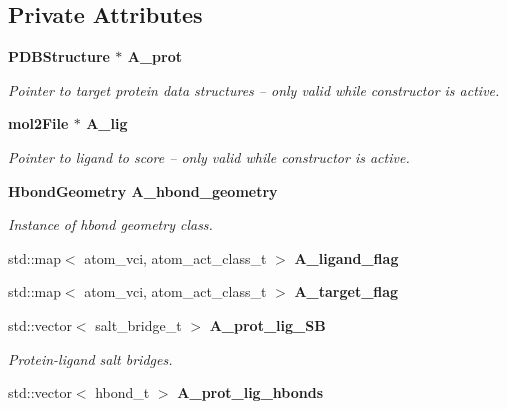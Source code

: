 \subsection*{Private Attributes}
\begin{CompactItemize}
\item 
\bf{PDBStructure} $\ast$ \bf{A\_\-prot}\label{classASCbase_1_1ProtLigScore_5b1a480b3bf5f9c011497ba534fa9461}

\begin{CompactList}\small\item\em Pointer to target protein data structures -- only valid while constructor is active. \item\end{CompactList}\item 
\bf{mol2File} $\ast$ \bf{A\_\-lig}\label{classASCbase_1_1ProtLigScore_dfbf1284c9cbed4b54206df9fdddef28}

\begin{CompactList}\small\item\em Pointer to ligand to score -- only valid while constructor is active. \item\end{CompactList}\item 
\bf{Hbond\-Geometry} \bf{A\_\-hbond\_\-geometry}\label{classASCbase_1_1ProtLigScore_6671697549e83639b589b71488f550d9}

\begin{CompactList}\small\item\em Instance of hbond geometry class. \item\end{CompactList}\item 
std::map$<$ atom\_\-vci, atom\_\-act\_\-class\_\-t $>$ \textbf{A\_\-ligand\_\-flag}\label{classASCbase_1_1ProtLigScore_8b4747bab4ae82a169058b0aef3a2f42}

\item 
std::map$<$ atom\_\-vci, atom\_\-act\_\-class\_\-t $>$ \textbf{A\_\-target\_\-flag}\label{classASCbase_1_1ProtLigScore_8f73fb747d5bf69e796cccad62f2926b}

\item 
std::vector$<$ salt\_\-bridge\_\-t $>$ \bf{A\_\-prot\_\-lig\_\-SB}\label{classASCbase_1_1ProtLigScore_0d045558a8b159755a49bfa691ea3977}

\begin{CompactList}\small\item\em Protein-ligand salt bridges. \item\end{CompactList}\item 
std::vector$<$ hbond\_\-t $>$ \bf{A\_\-prot\_\-lig\_\-hbonds}\label{classASCbase_1_1ProtLigScore_3cbb26774378dac3641e3060cc3bca30}


\end{CompactItemize}
